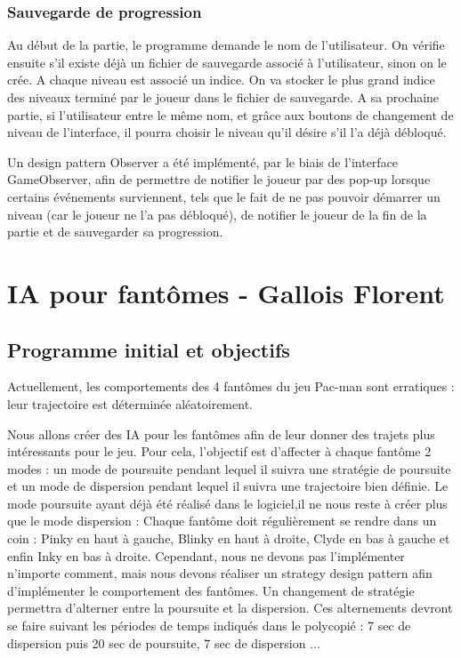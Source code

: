 \documentclass[a4paper,12pt]{report} %
\begin{document}
\subsubsection{Sauvegarde de progression}
Au début de la partie, le programme demande le nom de l'utilisateur.
On vérifie ensuite s'il existe déjà un fichier de sauvegarde associé
à l'utilisateur, sinon on le crée. A chaque niveau est associé un
indice. On va stocker le plus grand indice des niveaux terminé par
le joueur dans le fichier de sauvegarde. A sa prochaine partie, si
l'utilisateur entre le même nom, et grâce aux boutons de changement
de niveau de l'interface, il pourra choisir le niveau qu'il désire
s'il l'a déjà débloqué.

Un design pattern Observer a été implémenté, par le biais de l'interface
GameObserver, afin de permettre de notifier le joueur par des pop-up
lorsque certains événements surviennent, tels que le fait de ne pas
pouvoir démarrer un niveau (car le joueur ne l'a pas débloqué), de
notifier le joueur de la fin de la partie et de sauvegarder sa progression.


\section{IA pour fantômes - Gallois Florent}
\subsection{Programme initial et objectifs}
Actuellement, les comportements des 4 fantômes du jeu Pac-man sont erratiques : 
leur trajectoire est déterminée aléatoirement.

Nous allons créer des IA pour les fantômes afin de leur donner des trajets plus intéressants pour le jeu.
Pour cela, l'objectif est d'affecter à chaque fantôme 2 modes : un mode de poursuite pendant lequel il suivra une stratégie de poursuite et un mode de dispersion pendant lequel il suivra une trajectoire bien définie.
Le mode poursuite ayant déjà été réalisé dans le logiciel,il ne nous reste à créer plus que le mode dispersion : 
Chaque fantôme doit régulièrement se rendre dans un coin : Pinky en haut à gauche, Blinky en haut à droite, Clyde en bas à gauche et enfin Inky en bas à droite.
Cependant, nous ne devons pas l'implémenter n'importe comment, mais nous devons réaliser un strategy design pattern afin d'implémenter le comportement des fantômes.
Un changement de stratégie permettra d'alterner entre la poursuite et la dispersion.
Ces alternements devront se faire suivant les périodes de temps indiqués dans le polycopié : 7 sec de dispersion puis 20 sec de poursuite, 7 sec de dispersion ... 
\end{document}
